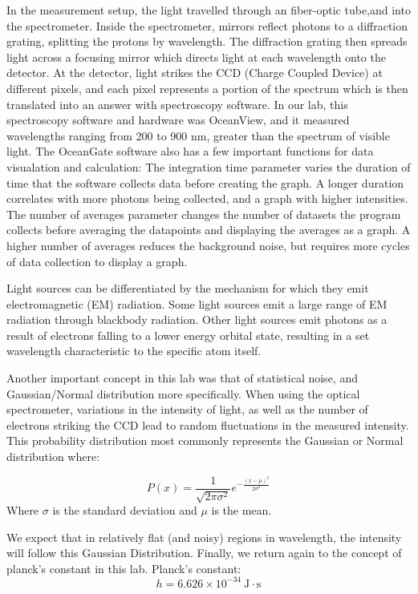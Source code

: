 \documentclass{article}[12pt]
\begin{document}
In the measurement setup, the light travelled through an fiber-optic tube,and into the spectrometer.
Inside the spectrometer, mirrors reflect photons to a diffraction grating, splitting the protons by wavelength.
The diffraction grating then spreads light across a focusing mirror which directs light at each wavelength onto the detector.
At the detector, light strikes the CCD (Charge Coupled Device) at different pixels, and each pixel represents a portion of the spectrum which is then translated into an answer with spectroscopy software.
In our lab, this spectroscopy software and hardware was OceanView, and it measured wavelengths ranging from 200 to 900 nm, greater than the spectrum of visible light.
The OceanGate software also has a few important functions for data visualation and calculation:
The integration time parameter varies the duration of time that the software collects data before creating the graph.
A longer duration correlates with more photons being collected, and a graph with higher intensities.
The number of averages parameter changes the number of datasets the program collects before averaging the datapoints and displaying the averages as a graph.
A higher number of averages reduces the background noise, but requires more cycles of data collection to display a graph.

Light sources can be differentiated by the mechanism for which they emit electromagnetic (EM) radiation.
Some light sources emit a large range of EM radiation through blackbody radiation.
Other light sources emit photons as a result of electrons falling to a lower energy orbital state, resulting in a set wavelength characteristic to the specific atom itself. 

Another important concept in this lab was that of statistical noise, and Gaussian/Normal distribution more specifically. 
When using the optical spectrometer, variations in the intensity of light, as well as the number of electrons striking the CCD lead to random fluctuations in the measured intensity.
This probability distribution most commonly represents the Gaussian or Normal distribution where:

\begin{equation}
  P(x) = \frac{1}{\sqrt{2 \pi \sigma ^2}} e ^{-\frac{(x-\mu )^2}{2 \sigma ^2}} 
\end{equation}
Where $ \sigma   $ is the standard deviation and $ \mu  $ is the mean.

We expect that in relatively flat (and noisy) regions in wavelength, the intensity will follow this Gaussian Distribution.
Finally, we return again to the concept of planck's constant in this lab.
Planck's constant:
\begin{equation}
  h = 6.626 \times 10 ^{-34}~\mathrm{J\cdot s}
\end{equation} 
\end{document}
